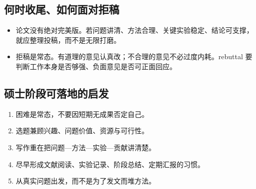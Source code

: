 \subsection{何时收尾、如何面对拒稿}
\begin{itemize}
  \item 论文没有绝对完美版。若问题讲清、方法合理、关键实验稳定、结论可支撑，就应整理投稿，而不是无限打磨。
  \item 拒稿是常态。有道理的意见认真改；不合理的意见不必过度内耗。rebuttal 要判断工作本身是否够强、负面意见是否可正面回应。
\end{itemize}

\subsection{硕士阶段可落地的启发}
\begin{enumerate}
  \item 困难是常态，不要因短期无成果否定自己。
  \item 选题兼顾兴趣、问题价值、资源与可行性。
  \item 写作重在把问题—方法—实验—贡献讲清楚。
  \item 尽早形成文献阅读、实验记录、阶段总结、定期汇报的习惯。
  \item 从真实问题出发，而不是为了发文而堆方法。
\end{enumerate}
